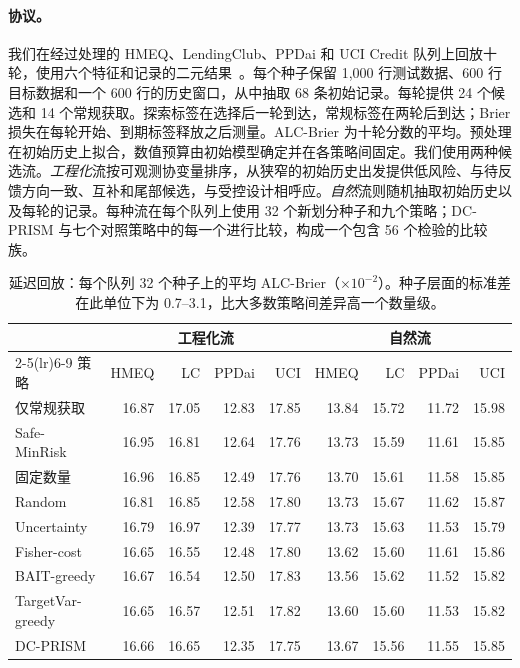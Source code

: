 \documentclass[runningheads]{llncs}
\begin{document}
\paragraph{协议。}我们在经过处理的 HMEQ、LendingClub、PPDai 和 UCI Credit 队列上回放十轮，使用六个特征和记录的二元结果~\cite{sasHMEQ,lendingclubSource,ppdaiSource,yeh2009comparison}。每个种子保留 1{,}000 行测试数据、600 行目标数据和一个 600 行的历史窗口，从中抽取 68 条初始记录。每轮提供 24 个候选和 14 个常规获取。探索标签在选择后一轮到达，常规标签在两轮后到达；Brier 损失在每轮开始、到期标签释放之后测量。ALC-Brier 为十轮分数的平均。预处理在初始历史上拟合，数值预算由初始模型确定并在各策略间固定。我们使用两种候选流。\emph{工程化}流按可观测协变量排序，从狭窄的初始历史出发提供低风险、与待反馈方向一致、互补和尾部候选，与受控设计相呼应。\emph{自然}流则随机抽取初始历史以及每轮的记录。每种流在每个队列上使用 32 个新划分种子和九个策略；DC-PRISM 与七个对照策略中的每一个进行比较，构成一个包含 56 个检验的比较族。

\begin{table}[t]
\caption{延迟回放：每个队列 32 个种子上的平均 ALC-Brier（$\times10^{-2}$）。种子层面的标准差在此单位下为 0.7--3.1，比大多数策略间差异高一个数量级。}
\label{tab:replay}
\centering\small
\setlength{\tabcolsep}{3.5pt}
\begin{tabular}{lrrrrrrrr}
\toprule
& \multicolumn{4}{c}{工程化流} & \multicolumn{4}{c}{自然流} \\
\cmidrule(lr){2-5}\cmidrule(lr){6-9}
策略 & HMEQ & LC & PPDai & UCI & HMEQ & LC & PPDai & UCI \\
\midrule
仅常规获取 & 16.87 & 17.05 & 12.83 & 17.85 & 13.84 & 15.72 & 11.72 & 15.98 \\
Safe-MinRisk & 16.95 & 16.81 & 12.64 & 17.76 & 13.73 & 15.59 & 11.61 & 15.85 \\
固定数量 & 16.96 & 16.85 & 12.49 & 17.76 & 13.70 & 15.61 & 11.58 & 15.85 \\
Random & 16.81 & 16.85 & 12.58 & 17.80 & 13.73 & 15.67 & 11.62 & 15.87 \\
Uncertainty & 16.79 & 16.97 & 12.39 & 17.77 & 13.73 & 15.63 & 11.53 & 15.79 \\
Fisher-cost & 16.65 & 16.55 & 12.48 & 17.80 & 13.62 & 15.60 & 11.61 & 15.86 \\
BAIT-greedy & 16.67 & 16.54 & 12.50 & 17.83 & 13.56 & 15.62 & 11.52 & 15.82 \\
TargetVar-greedy & 16.65 & 16.57 & 12.51 & 17.82 & 13.60 & 15.60 & 11.53 & 15.82 \\
DC-PRISM & 16.66 & 16.65 & 12.35 & 17.75 & 13.67 & 15.56 & 11.55 & 15.85 \\
\bottomrule
\end{tabular}
\end{table}
\end{document}

